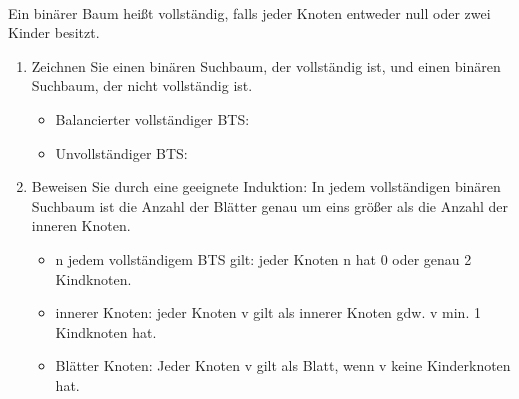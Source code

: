 \documentclass[a4paper]{assignment}
\begin{document}
\begin{problemlist}

 \\
Ein binärer Baum heißt vollständig, falls jeder Knoten entweder null oder zwei Kinder besitzt.
\begin{enumerate}

\item Zeichnen Sie einen binären Suchbaum, der vollständig ist, und einen binären Suchbaum, der nicht vollständig ist.

\begin{answer}
\begin{itemize}
	\item Balancierter vollständiger BTS:
\end{itemize}

\begin{itemize}
	\item Unvollständiger BTS:
\end{itemize}


\end{answer}

\item Beweisen Sie durch eine geeignete Induktion: In jedem vollständigen binären Suchbaum ist die Anzahl der Blätter genau um eins größer als die Anzahl der inneren Knoten.

\begin{answer}
\begin{itemize}
	\item n jedem vollständigem BTS gilt: jeder Knoten n hat 0 oder genau 2 Kindknoten. 
    \item innerer Knoten: jeder Knoten v gilt als innerer Knoten gdw. v min. 1 Kindknoten hat.
    \item Blätter Knoten: Jeder Knoten v gilt als Blatt, wenn v keine Kinderknoten hat.
\end{itemize}


\end{answer}
\end{enumerate}
\end{problemlist}
\end{document}
